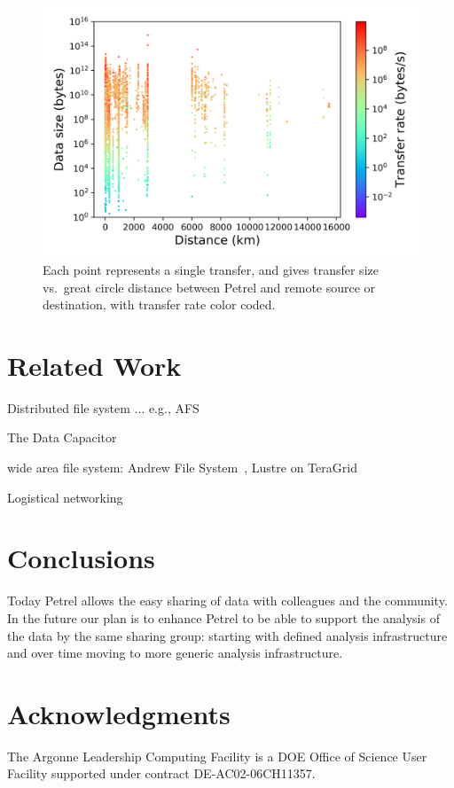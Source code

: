 \documentclass[sigconf]{acmart}
\begin{document}
\begin{figure}
\centering
\includegraphics[trim=0.1in 0.1in 0.1in 0.1in,clip,width=\columnwidth]{Figures/size-distance-speed.png}

\vspace{-2ex}

\caption{Each point represents a single transfer,
and gives transfer size vs.\ great circle distance between Petrel and remote source or destination, 
with transfer rate color coded.\label{fig:usage2}}
\end{figure}



\section{Related Work}

Distributed file system ... e.g., AFS 

The Data Capacitor~\cite{simms2007empowering}

wide area file system: Andrew File System~\cite{howard1988scale}, Lustre on TeraGrid~\cite{simms2007wide}

Logistical networking~\cite{beck2000logistical} 




\section{Conclusions}


Today Petrel allows the easy sharing of data with colleagues and the community.
In the future our plan is to enhance Petrel to be able to support the analysis of the data by the same sharing group:
starting with defined analysis infrastructure and over time moving to more generic analysis infrastructure.

\section*{Acknowledgments}
The Argonne Leadership Computing Facility is a DOE Office of Science User Facility supported under contract DE-AC02-06CH11357.



 
\end{document}
